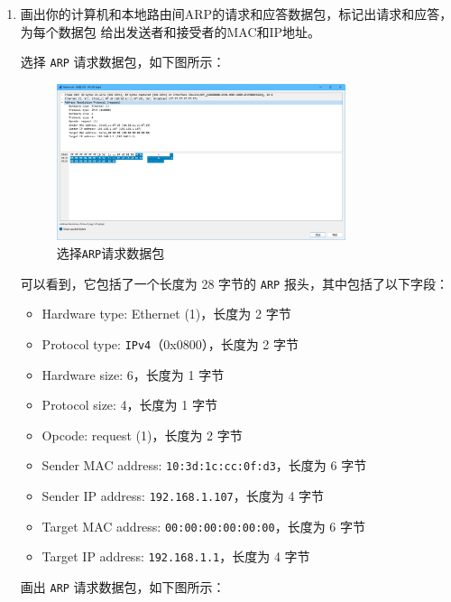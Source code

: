 \documentclass{article}
\begin{document}
\begin{enumerate}[noitemsep]
	\item 
	画出你的计算机和本地路由间ARP的请求和应答数据包，标记出请求和应答，为每个数据包 给出发送者和接受者的MAC和IP地址。
	
	选择 \texttt{ARP} 请求数据包，如下图所示：
	
	\begin{figure}[H]
		\centering
		\includegraphics[width=0.8\textwidth]{img/6.png}
		\caption{选择\texttt{ARP}请求数据包}
		\label{fig:6}
	\end{figure}
	
	可以看到，它包括了一个长度为 28 字节的 \texttt{ARP} 报头，其中包括了以下字段：
	
	\begin{itemize}[noitemsep]
		\item Hardware type: Ethernet (1)，长度为 2 字节
		\item Protocol type: \texttt{IPv4}（0x0800），长度为 2 字节
		\item Hardware size: 6，长度为 1 字节
		\item Protocol size: 4，长度为 1 字节
		\item Opcode: request (1)，长度为 2 字节
		\item Sender MAC address: \texttt{10:3d:1c:cc:0f:d3}，长度为 6 字节
		\item Sender IP address: \texttt{192.168.1.107}，长度为 4 字节
		\item Target MAC address: \texttt{00:00:00:00:00:00}，长度为 6 字节
		\item Target IP address: \texttt{192.168.1.1}，长度为 4 字节
	\end{itemize}
	
	画出 \texttt{ARP} 请求数据包，如下图所示：
	

\end{enumerate}
\end{document}
